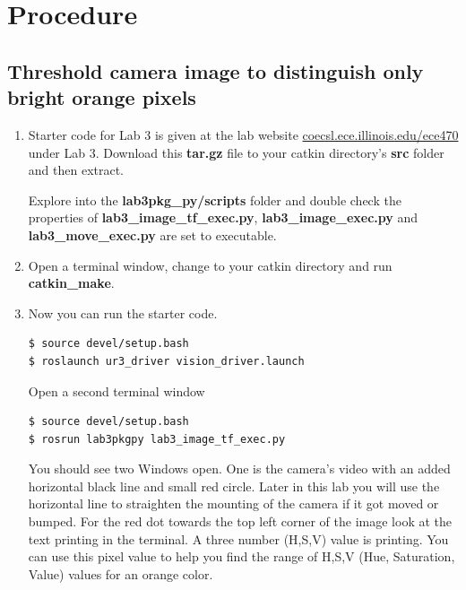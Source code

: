 \section{Procedure}

\subsection{Threshold camera image to distinguish only bright orange pixels}

\begin{enumerate}

\item Starter code for Lab 3 is given at the lab website \url{coecsl.ece.illinois.edu/ece470} under Lab 3. Download this \textbf{tar.gz} file to your catkin directory’s \textbf{src} folder and then extract. 

Explore into the \textbf{lab3pkg\_py/scripts} folder and double check the properties of \textbf{lab3\_image\_tf\_exec.py}, \textbf{lab3\_image\_exec.py} and \textbf{lab3\_move\_exec.py} are set to executable.  

\item Open a terminal window, change to your catkin directory and run \textbf{catkin\_make}. 

 
\item Now you can run the starter code. 

\begin{lstlisting}[language=bash]
$ source devel/setup.bash
$ roslaunch ur3_driver vision_driver.launch
\end{lstlisting}

Open a second terminal window

\begin{lstlisting}[language=bash]
$ source devel/setup.bash
$ rosrun lab3pkgpy lab3_image_tf_exec.py
\end{lstlisting}

You should see two Windows open.  One is the camera’s video with an added horizontal black line and small red circle.  Later in this lab you will use the horizontal line to straighten the mounting of the camera if it got moved or bumped.  For the red dot towards the top left corner of the image look at the text printing in the terminal.  A three number (H,S,V) value is printing.  You can use this pixel value to help you find the range of H,S,V (Hue, Saturation, Value) values for an orange color. 


\end{enumerate}
